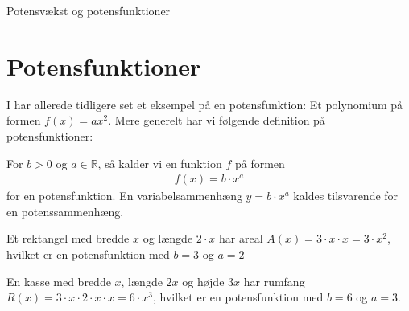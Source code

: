
\begin{center}
\Huge
Potensvækst og potensfunktioner
\end{center}
\section*{Potensfunktioner}

I har allerede tidligere set et eksempel på en potensfunktion: Et polynomium på formen $f(x) = ax^2$. Mere generelt har vi følgende definition på potensfunktioner:
\begin{defn}
For $b>0$ og $a\in \mathbb{R}$, så kalder vi en funktion $f$ på formen 
\begin{align*}
f(x) = b\cdot x^a
\end{align*}
for en potensfunktion. En variabelsammenhæng $y=b\cdot x^a$ kaldes tilsvarende for en potenssammenhæng.
\end{defn}

\begin{exa}
Et rektangel med bredde $x$ og længde $2\cdot x$ har areal $A(x) = 3\cdot x\cdot x = 3\cdot x^2$, hvilket er en potensfunktion med $b=3$ og $a=2$
\end{exa}
\begin{exa}
En kasse med bredde $x$, længde $2x$ og højde $3x$ har rumfang $R(x) = 3\cdot x \cdot 2\cdot x\cdot x = 6\cdot x^3$, hvilket er en potensfunktion med $b = 6$ og $a=3$.
\end{exa}

